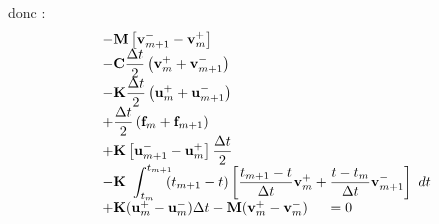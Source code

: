 \documentclass[12pt,a4paper]{report}
\begin{document}
donc :
\begin{equation}
\begin{array}{r l}
	&\displaystyle
	 -\mathbf{M}
	    	\left[ \mathbf{v}_{m+1}^- 
	    		- \mathbf{v}_m^+ \right]
	\\ 
	  &\displaystyle
	  -\mathbf{C} \frac{\Delta t}{2}
		\left(
			\mathbf{v}_m^+ + 
			\mathbf{v}_{m+1}^- 
		\right)
	\\
	  &\displaystyle
	 -\mathbf{K} \frac{\Delta t}{2}
		\left(
			\mathbf{u}_m^+ + 
			\mathbf{u}_{m+1}^- 
		\right)
	\\
	  &\displaystyle
	   +\frac{\Delta t}{2}
		\left(
			\mathbf{f}_m + 
			\mathbf{f}_{m+1}
		\right) 
	\\
	  &+\displaystyle
	    \mathbf{K}
	    	\left[ \mathbf{u}_{m+1}^- 
	    		- \mathbf{u}_m^+ \right]		
			\frac{\Delta t}{2}
	\\
	  &\displaystyle	    
	    -\mathbf{K}~\int_{t_m}^{t_{m+1}} \!\!\! 	
		(t_{m+1}-t) \left[
			\frac{t_{m+1}-t}{\Delta t} \mathbf{v}_m^+ + 
			\frac{t-t_m}{\Delta t} \mathbf{v}_{m+1}^- 
			\right] ~dt
	\\
	  &+ \mathbf{K} (\mathbf{u}_m^+ - \mathbf{u}_m^-) \Delta t
	   - \mathbf{M} (\mathbf{v}_m^+ - \mathbf{v}_m^-)
	~~~~=0	
\end{array}
\end{equation}
\end{document}
